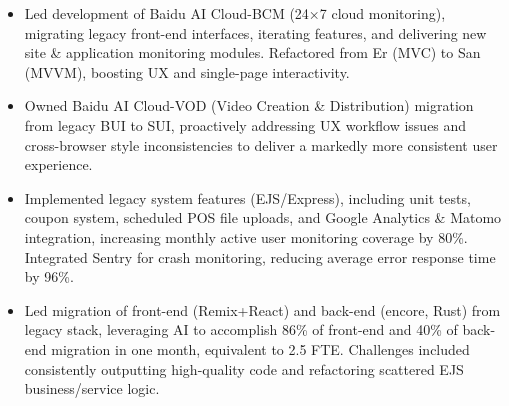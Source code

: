 \documentclass{resume}
\newcommand{\en}[1]{#1}
\newcommand{\zh}[1]{}
\begin{document}
\en{}
\zh{\datedsubsection{\textbf{\href{https://cloud.baidu.com/}{百度智能云（Baidu AI Cloud）}}}{2021/01 -- 2021/08}}
\en{}
\zh{\role{ACG 建站与云市场部}{前端研发实习}}
\begin{itemize}
    \item \en{Led development of Baidu AI Cloud-BCM (24×7 cloud monitoring), migrating legacy front-end interfaces, iterating features, and delivering new site \& application monitoring modules. Refactored from Er (MVC) to San (MVVM), boosting UX and single-page interactivity.}
          \zh{负责百度智能云-云监控 BCM，提供 7x24 小时的云产品报警监控服务，负责对老版本前端界面迁移至新版本的开发，维护功能的迭代和升级，负责新版站点监控，应用监控等，基于Er 框架（MVC）页面重构至 San (MVVM)框架。提升用户体验，同时提高单页面应用交互能力。}
    \item \en{Owned Baidu AI Cloud-VOD (Video Creation \& Distribution) migration from legacy BUI to SUI, proactively addressing UX workflow issues and cross-browser style inconsistencies to deliver a markedly more consistent user experience.}
          \zh{负责百度智能云-视频创作分发平台 VOD，迁移老式 BUI 组件库至 SUI 组件库，主动提出流程上的体验问题，以及老式组件库对不同浏览器的样式效果不同导致的问题，及时反馈和修复，用户体验一致性显著提升。}
\end{itemize}

\en{}
\zh{\datedsubsection{\textbf{Absotlute IT}, 澳大利亚}{2024/01 -- 至今}}
\en{}
\zh{\role{INDOS - Independent Online Solutions（线上超市快送系统）}{全栈工程师}}
\begin{itemize}
    \item \en{Implemented legacy system features (EJS/Express), including unit tests, coupon system, scheduled POS file uploads, and Google Analytics \& Matomo integration, increasing monthly active user monitoring coverage by 80\%. Integrated Sentry for crash monitoring, reducing average error response time by 96\%.}
          \zh{负责旧版的功能开发 - 例如单元测试，优惠券系统，POS文件的上传的定时任务系统，集成 Google Analytics \& Matomo，月活用户监测覆盖率提升 80\%。集成 Sentry 实现崩溃监控，平均错误响应时间缩短 96\%。}
    \item \en{Led migration of front-end (Remix+React) and back-end (encore, Rust) from legacy stack, leveraging AI to accomplish 86\% of front-end and 40\% of back-end migration in one month, equivalent to 2.5 FTE. Challenges included consistently outputting high-quality code and refactoring scattered EJS business/service logic.}
          \zh{主导 Remix+React 前端与 encore(Rust) 后端迁移 - 借助AI能力快速实现86\%的前端功能以及40\%的后端服务的迁移(一个月) 。实现以为等同于2.5人的工作量。难点：持续输出高质量代码以及重构相关分在各处ejs的业务逻辑代码和服务代码。}
\end{itemize}
\end{document}
